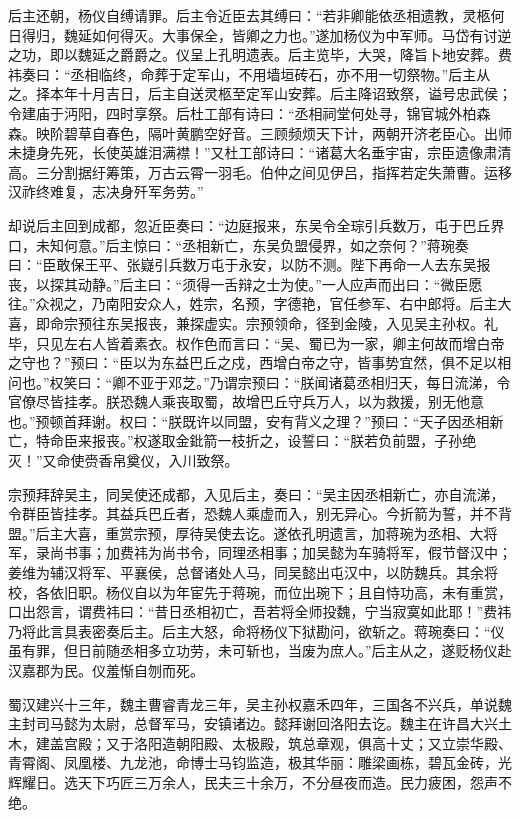 后主还朝，杨仪自缚请罪。后主令近臣去其缚曰：“若非卿能依丞相遗教，灵柩何日得归，魏延如何得灭。大事保全，皆卿之力也。”遂加杨仪为中军师。马岱有讨逆之功，即以魏延之爵爵之。仪呈上孔明遗表。后主览毕，大哭，降旨卜地安葬。费祎奏曰：“丞相临终，命葬于定军山，不用墙垣砖石，亦不用一切祭物。”后主从之。择本年十月吉日，后主自送灵柩至定军山安葬。后主降诏致祭，谥号忠武侯；令建庙于沔阳，四时享祭。后杜工部有诗曰：“丞相祠堂何处寻，锦官城外柏森森。映阶碧草自春色，隔叶黄鹏空好音。三顾频烦天下计，两朝开济老臣心。出师未捷身先死，长使英雄泪满襟！”又杜工部诗曰：“诸葛大名垂宇宙，宗臣遗像肃清高。三分割据纡筹策，万古云霄一羽毛。伯仲之间见伊吕，指挥若定失萧曹。运移汉祚终难复，志决身歼军务劳。”

却说后主回到成都，忽近臣奏曰：“边庭报来，东吴令全琮引兵数万，屯于巴丘界口，未知何意。”后主惊曰：“丞相新亡，东吴负盟侵界，如之奈何？”蒋琬奏曰：“臣敢保王平、张嶷引兵数万屯于永安，以防不测。陛下再命一人去东吴报丧，以探其动静。”后主曰：“须得一舌辩之士为使。”一人应声而出曰：“微臣愿往。”众视之，乃南阳安众人，姓宗，名预，字德艳，官任参军、右中郎将。后主大喜，即命宗预往东吴报丧，兼探虚实。宗预领命，径到金陵，入见吴主孙权。礼毕，只见左右人皆着素衣。权作色而言曰：“吴、蜀已为一家，卿主何故而增白帝之守也？”预曰：“臣以为东益巴丘之戍，西增白帝之守，皆事势宜然，俱不足以相问也。”权笑曰：“卿不亚于邓芝。”乃谓宗预曰：“朕闻诸葛丞相归天，每日流涕，令官僚尽皆挂孝。朕恐魏人乘丧取蜀，故增巴丘守兵万人，以为救援，别无他意也。”预顿首拜谢。权曰：“朕既许以同盟，安有背义之理？”预曰：“天子因丞相新亡，特命臣来报丧。”权遂取金鈚箭一枝折之，设誓曰：“朕若负前盟，子孙绝灭！”又命使赍香帛奠仪，入川致祭。

宗预拜辞吴主，同吴使还成都，入见后主，奏曰：“吴主因丞相新亡，亦自流涕，令群臣皆挂孝。其益兵巴丘者，恐魏人乘虚而入，别无异心。今折箭为誓，并不背盟。”后主大喜，重赏宗预，厚待吴使去讫。遂依孔明遗言，加蒋琬为丞相、大将军，录尚书事；加费祎为尚书令，同理丞相事；加吴懿为车骑将军，假节督汉中；姜维为辅汉将军、平襄侯，总督诸处人马，同吴懿出屯汉中，以防魏兵。其余将校，各依旧职。杨仪自以为年宦先于蒋琬，而位出琬下；且自恃功高，未有重赏，口出怨言，谓费祎曰：“昔日丞相初亡，吾若将全师投魏，宁当寂寞如此耶！”费祎乃将此言具表密奏后主。后主大怒，命将杨仪下狱勘问，欲斩之。蒋琬奏曰：“仪虽有罪，但日前随丞相多立功劳，未可斩也，当废为庶人。”后主从之，遂贬杨仪赴汉嘉郡为民。仪羞惭自刎而死。

蜀汉建兴十三年，魏主曹睿青龙三年，吴主孙权嘉禾四年，三国各不兴兵，单说魏主封司马懿为太尉，总督军马，安镇诸边。懿拜谢回洛阳去讫。魏主在许昌大兴土木，建盖宫殿；又于洛阳造朝阳殿、太极殿，筑总章观，俱高十丈；又立崇华殿、青霄阁、凤凰楼、九龙池，命博士马钧监造，极其华丽：雕梁画栋，碧瓦金砖，光辉耀日。选天下巧匠三万余人，民夫三十余万，不分昼夜而造。民力疲困，怨声不绝。

